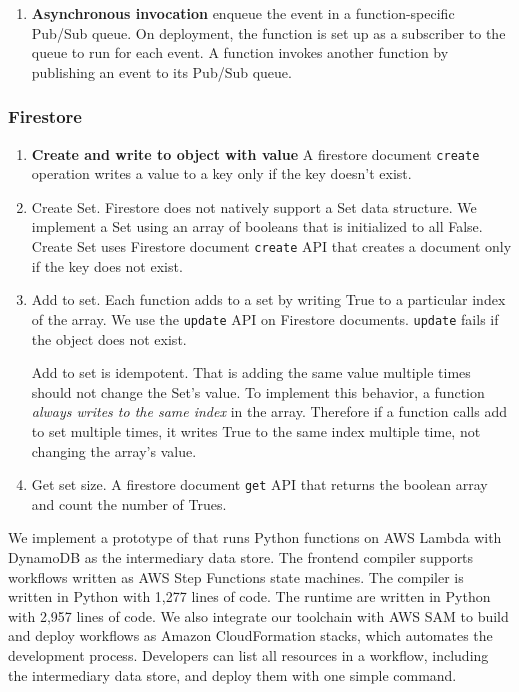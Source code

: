 \begin{enumerate}
  \item \textbf{Asynchronous invocation} enqueue the event in a function-specific Pub/Sub queue. On deployment, the function is set up as a subscriber to the queue to run for each event. A function invokes another function by publishing an event to its Pub/Sub queue.
\end{enumerate}

\subsubsection{Firestore}

\begin{enumerate}
  \item \textbf{Create and write to object with value} A firestore document \texttt{create} operation writes a value to a key only if the key doesn't exist.
  \item Create Set. Firestore does not natively support a Set data structure. We implement a Set using an array of booleans that is initialized to all False. Create Set uses Firestore document \texttt{create} API that creates a document only if the key does not exist.
  \item Add to set. Each function adds to a set by writing True to a particular index of the array. We use the \texttt{update} API on Firestore documents. \texttt{update} fails if the object does not exist. 

  Add to set is idempotent. That is adding the same value multiple times should not change the Set's value. To implement this behavior, a function \emph{always writes to the same index} in the array. Therefore if a function calls add to set multiple times, it writes True to the same index multiple time, not changing the array's value.
  \item Get set size. A firestore document \texttt{get} API that returns the boolean array and count the number of Trues.
\end{enumerate}


We implement a prototype of \name{} that runs Python functions on AWS Lambda
with DynamoDB as the intermediary data store. The frontend compiler
supports workflows written as AWS Step Functions state machines. The compiler
is written in Python with 1,277 lines of code.
The runtime are written in Python with 2,957 lines of code. We also integrate
our toolchain with AWS SAM to build and deploy \name{} workflows as Amazon
CloudFormation stacks, which automates the development process. Developers can
list all resources in a workflow, including the intermediary data store, and
deploy them with one simple command.

